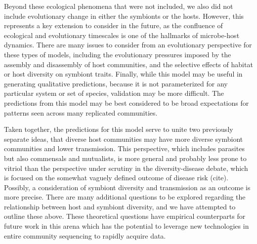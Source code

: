 \documentclass[12pt]{article}
\begin{document}
Beyond these ecological phenomena that were not included, we also did not include evolutionary change in either the symbionts or the hosts. 
However, this represents a key extension to consider in the future, as the confluence of ecological and evolutionary timescales is one of the hallmarks of microbe-host dynamics. 
There are many issues to consider from an evolutionary perspective for these types of models, including the evolutionary pressures imposed by the assembly and disassembly of host communities, and the selective effects of habitat or host diversity on symbiont traits. 
Finally, while this model may be useful in generating qualitative predictions, because it is not parameterized for any particular system or set of species, validation may be more difficult. 
The predictions from this model may be best considered to be broad expectations for patterns seen across many replicated communities. 

Taken together, the predictions for this model serve to unite two previously separate ideas, that diverse host communities may have more diverse symbiont communities and lower transmission. 
This perspective, which includes parasites but also commensals and mutualists, is more general and probably less prone to vitriol than the perspective under scrutiny in the diversity-disease debate, which is focused on the somewhat vaguely defined outcome of disease risk (cite). 
Possibly, a consideration of symbiont diversity and transmission as an outcome is more precise. 
There are many additional questions to be explored regarding the relationship between host and symbiont diversity, and we have attempted to outline these above.
These theoretical questions have empirical counterparts for future work in this arena which has the potential to leverage new technologies in entire community sequencing to rapidly acquire data. 




\newpage
\end{document}
